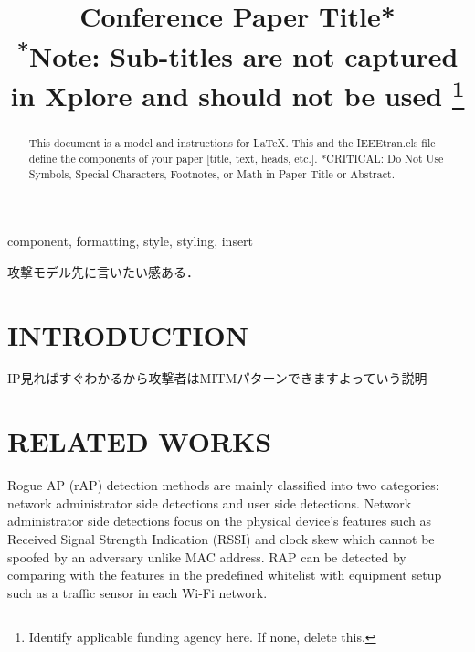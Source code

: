 \documentclass[conference]{IEEEtran}
\begin{document}
\title{Conference Paper Title*\\
{\footnotesize \textsuperscript{*}Note: Sub-titles are not captured in Xplore and
should not be used}
\thanks{Identify applicable funding agency here. If none, delete this.}
}

\author{
\and
{}
\and
{}
\and

}

\maketitle

\begin{abstract}
This document is a model and instructions for \LaTeX.
This and the IEEEtran.cls file define the components of your paper [title, text, heads, etc.]. *CRITICAL: Do Not Use Symbols, Special Characters, Footnotes, 
or Math in Paper Title or Abstract.
\end{abstract}

\begin{IEEEkeywords}
component, formatting, style, styling, insert
\end{IEEEkeywords}
 攻撃モデル先に言いたい感ある．
\section{INTRODUCTION}
IP見ればすぐわかるから攻撃者はMITMパターンできますよっていう説明
\section{RELATED WORKS}
Rogue AP (rAP) detection methods are mainly classified into two categories: network administrator side detections and user side detections.
Network administrator side detections focus on the physical device's features such as Received Signal Strength Indication (RSSI) and clock skew which cannot be spoofed by an adversary unlike MAC address.
RAP can be detected by comparing with the features in the predefined whitelist with equipment setup such as a traffic sensor in each Wi-Fi network.
\end{document}
